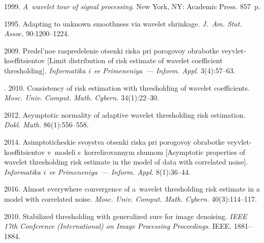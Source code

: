   \begin{multicols}{2}

\renewcommand{\bibname}{\protect\rmfamily References}

{\small\frenchspacing
 {%
 \begin{thebibliography}{99}

 1999. 
\textit{A~wavelet tour of signal processing}. New York, NY: Academic Press. 857~p.

 1995. Adapting to unknown smoothness via 
wavelet shrinkage. \textit{J.~Am. Stat. Assoc.} 90:1200--1224.

\columnbreak

 2009. Predel'noe raspredelenie otsenki riska pri porogovoy 
obrabotke veyvlet-koeffitsientov [Limit distribution of risk estimate of wavelet 
coefficient thresholding]. \textit{Informatika i~ee Primeneniya~--- Inform. Appl.}
3(4):57--63.

\vspace*{-2pt}

. 2010. Consistency of risk estimation 
with thresholding of wavelet coefficients. \textit{Mosc. Univ. Comput. Math. 
Cybern.} 34(1):22--30.

\pagebreak

 2012. Asymptotic normality of adaptive wavelet thresholding risk estimation. 
 \textit{Dokl. Math.} 86(1):556--558.

 2014. Asimptoticheskie svoystva 
otsenki riska pri porogovoy obrabotke veyvlet-koeffitsientov v~modeli 
s~korrelirovannym shumom
[Asymptotic properties of wavelet thresholding risk estimate in the model 
of data with correlated noise]. \textit{Informatika i~ee Primeneniya~--- Inform. Appl.}
8(1):36--44.

 2016. Almost everywhere convergence of 
a~wavelet thresholding risk estimate in a model with correlated noise. 
\textit{Mosc. Univ. Comput. Math. Cybern.} 40(3):114--117.

 2010. 
Stabilized thresholding with generalized sure for image denoising. 
\textit{IEEE 17th Conference (International) on Image Processing Proceedings}. 
IEEE. 1881--1884.


\end{thebibliography}}}
\end{multicols}
